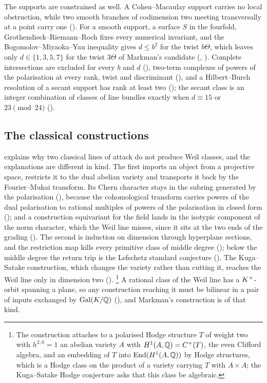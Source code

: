 The supports are constrained as well. A Cohen--Macaulay support carries no
local obstruction, while two smooth branches of codimension two meeting
transversally at a point carry one (). For a smooth support, a surface $S$ in the
fourfold, Grothendieck--Riemann--Roch fixes every numerical invariant, and the
Bogomolov--Miyaoka--Yau inequality gives $d\le b^{2}$ for the twist
$b\Theta$, which leaves only $d\in\{1,3,5,7\}$ for the twist $3\Theta$ of
Markman's candidate (,
). Complete
intersections are excluded for every $b$ and $d$ (), two-term
complexes of powers of the polarisation at every rank, twist and
discriminant (), and a Hilbert--Burch resolution of a
secant support has rank at least two (); the secant
class is an integer combination of classes of line bundles exactly when
$d\equiv15$ or $23\pmod{24}$ ().

\subsection{The classical constructions}

 explains why two classical lines of attack do not
produce Weil classes, and the explanations are different in kind. The first
imports an object from a projective space, restricts it to the dual abelian
variety and transports it back by the Fourier--Mukai transform. Its Chern
character stays in the subring generated by the polarisation
(), because the cohomological transform carries powers of
the dual polarisation to rational multiples of powers of the polarisation in
closed form (); and a construction equivariant for the
field lands in the isotypic component of the norm character, which the Weil
line misses, since it sits at the two ends of the grading
(). The second is induction on dimension through
hyperplane sections, and the restriction map kills every primitive class of
middle degree (); below the middle degree the return
trip is the Lefschetz standard conjecture (). The
Kuga--Satake construction, which changes the variety rather than cutting it,
reaches the Weil line only in dimension two ().%
\footnote{The construction attaches to a polarised Hodge structure $T$ of
weight two with $h^{2,0}=1$ an abelian variety $A$ with
$H^{1}(A,\mathbb{Q})=C^{+}(T)$, the even Clifford algebra, and an embedding of
$T$ into $\operatorname{End}(H^{1}(A,\mathbb{Q}))$ by Hodge structures, which is a Hodge class on
the product of a variety carrying $T$ with $A\times A$; the Kuga--Satake
Hodge conjecture asks that this class be algebraic.} A rational
class of the Weil line has a $K^{\times}$-orbit spanning a plane, so any
construction reaching it must be bilinear in a pair of inputs exchanged by
$\operatorname{Gal}(K/\mathbb{Q})$ (), and Markman's construction is of that
kind.

